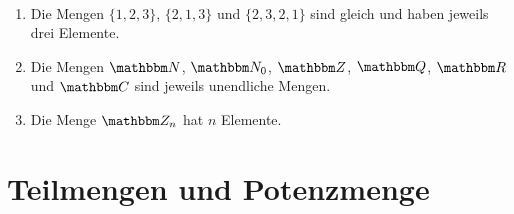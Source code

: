 \begin{Unit}[Beispiel] \ 
\begin{enumerate}
\item Die Mengen $\{1, 2, 3\}$, $\{ 2, 1, 3\}$ und
$\{2, 3, 2, 1\}$ sind gleich und haben jeweils drei Elemente.

\item Die Mengen $\NN$, $\NN_0$, $\ZZ$, $\QQ$, $\RR$ und $\CC$ sind jeweils
unendliche Mengen.

\item Die Menge $\ZZ_n$ hat $n$ Elemente.
\end{enumerate}
\end{Unit}


\section{Teilmengen und Potenzmenge}
\label{sec:Mengen:Teilmengen und Potenzmenge}


